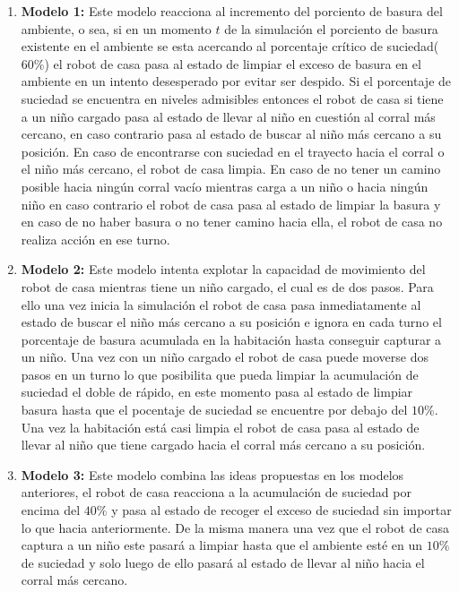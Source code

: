 \documentclass[10pt,letterpaper]{article}
\begin{document}
\begin{enumerate}
	\item[] \textbf{Modelo 1:} Este modelo reacciona al incremento del porciento de basura del ambiente, o sea, si en un momento $t$ de la simulación el porciento de basura existente en el ambiente se esta acercando al porcentaje crítico de suciedad($60\%$) el robot de casa pasa al estado de limpiar el exceso de basura en el ambiente en un intento desesperado por evitar ser despido. Si el porcentaje de suciedad se encuentra en niveles admisibles entonces el robot de casa si tiene a un niño cargado pasa al estado de llevar al niño en cuestión al corral más cercano, en caso contrario pasa al estado de buscar al niño más cercano a su posición. En caso de encontrarse con suciedad en el trayecto hacia el corral o el niño más cercano, el robot de casa limpia. En caso de no tener un camino posible hacia ningún corral vacío mientras carga a un niño o hacia ningún niño en caso contrario el robot de casa pasa al estado de limpiar la basura y en caso de no haber basura o no tener camino hacia ella, el robot de casa no realiza acción en ese turno.
	
	\item[] \textbf{Modelo 2:} Este modelo intenta explotar la capacidad de movimiento del robot de casa mientras tiene un niño cargado,  el cual es de dos pasos. Para ello una vez inicia la simulación el robot de casa pasa inmediatamente al estado de buscar el niño más cercano a su posición e ignora en cada turno el porcentaje de basura acumulada en la habitación hasta conseguir capturar a un niño. Una vez con un niño cargado el robot de casa puede moverse dos pasos en un turno lo que posibilita que pueda limpiar la acumulación de suciedad el doble de rápido, en este momento pasa al estado de limpiar basura hasta que el pocentaje de suciedad se encuentre por debajo del $10\%$. Una vez la habitación está casi limpia el robot de casa pasa al estado de llevar al niño que tiene cargado hacia el corral más cercano a su posición.
	
	\item[] \textbf{Modelo 3:} Este modelo combina las ideas propuestas en los modelos anteriores, el robot de casa reacciona a la acumulación de suciedad por encima del $40\%$ y pasa al estado de recoger el exceso de suciedad sin importar lo que hacia anteriormente. De la misma manera una vez que el robot de casa captura a un niño este pasará a limpiar hasta que el ambiente esté en un $10\%$ de suciedad y solo luego de ello pasará al estado de llevar al niño hacia el corral más cercano.
\end{enumerate}
\end{document}

